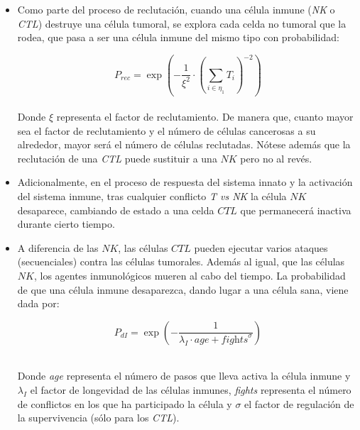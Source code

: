 \begin{itemize}
\item Como parte del proceso de reclutación, cuando una célula inmune (\textit{NK} o \textit{CTL}) destruye una célula tumoral, se explora cada celda no tumoral que la rodea, que pasa a ser una célula inmune del mismo tipo con probabilidad: 

\begin{equation}
    P_{rec} = \exp{\left(-\frac{1}{\xi^2} \cdot \left( \sum_{i \in \eta_1} T_i  \right)^{-2} \right)}
\end{equation}\\

Donde $\xi$ representa el factor de reclutamiento. De manera que, cuanto mayor sea el factor de reclutamiento y el número de células cancerosas a su alrededor, mayor será el número de células reclutadas. Nótese además que la reclutación de una \textit{CTL} puede sustituir a una $NK$ pero no al revés.\\

\item Adicionalmente, en el proceso de respuesta del sistema innato y la activación del sistema inmune, tras cualquier conflicto \textit{T vs NK} la célula $NK$ desaparece, cambiando de estado a una celda $CTL$ que permanecerá inactiva durante cierto tiempo. \\

\item A diferencia de las $NK$, las células $CTL$ pueden ejecutar varios ataques (secuenciales) contra las células tumorales. Además al igual, que las células $NK$, los agentes inmunológicos mueren al cabo del tiempo. La probabilidad de que una célula inmune desaparezca, dando lugar a una célula sana, viene dada por:

\begin{equation}
    P_{dI} = \exp{\left(- \frac{1}{\lambda_I \cdot \textit{age} + \textit{fights}^{\sigma}}\right)}
\end{equation}\\


Donde \textit{age} representa el número de pasos que lleva activa la célula inmune y $\lambda_I$ el factor de longevidad de las células inmunes, \textit{fights} representa el número de conflictos en los que ha participado la célula y $\sigma$ el factor de regulación de la supervivencia (sólo para los \textit{CTL}). 

\end{itemize}






